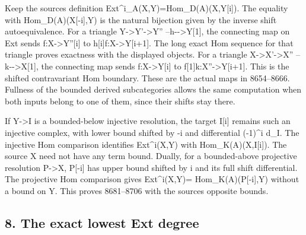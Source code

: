 Keep the source\textquotesingle s definition Ext\textasciicircum{}i\_\allowbreak{}A(X,\allowbreak{}Y)\allowbreak{}\allowbreak{}=Hom\_\allowbreak{}D(A)\allowbreak{}(X,\allowbreak{}Y[i]\allowbreak{})\allowbreak{}. The equality with Hom\_\allowbreak{}D(A)\allowbreak{}(X[-i]\allowbreak{},\allowbreak{}Y)\allowbreak{} is the natural bijection given by the inverse shift autoequivalence. For a triangle Y\allowbreak{}->Y'\allowbreak{}->Y'' --h-\allowbreak{}->Y[1]\allowbreak{},\allowbreak{} the connecting map on Ext sends f:\allowbreak{}X\allowbreak{}->Y''[i]\allowbreak{} to h[i]\allowbreak{}f:\allowbreak{}X\allowbreak{}->Y[i\allowbreak{}+1]\allowbreak{}. The long exact Hom sequence for that triangle proves exactness with the displayed objects. For a triangle X\allowbreak{}->X'\allowbreak{}->X'' --k-\allowbreak{}->X[1]\allowbreak{},\allowbreak{} the connecting map sends f:\allowbreak{}X\allowbreak{}->Y[i]\allowbreak{} to f[1]\allowbreak{}k:\allowbreak{}X''\allowbreak{}->Y[i\allowbreak{}+1]\allowbreak{}. This is the shifted contravariant Hom boundary. These are the actual maps in 8654–\allowbreak{}8666. Fullness of the bounded derived subcategories allows the same computation when both inputs belong to one of them,\allowbreak{} since their shifts stay there.

If Y\allowbreak{}->I is a bounded-below injective resolution,\allowbreak{} the target I[i]\allowbreak{} remains such an injective complex,\allowbreak{} with lower bound shifted by -i and differential (-1)\allowbreak{}\textasciicircum{}i d\_\allowbreak{}I. The injective Hom comparison identifies Ext\textasciicircum{}i(X,\allowbreak{}Y)\allowbreak{} with Hom\_\allowbreak{}K(A)\allowbreak{}(X,\allowbreak{}I[i]\allowbreak{})\allowbreak{}. The source X need not have any term bound. Dually,\allowbreak{} for a bounded-above projective resolution P\allowbreak{}->X,\allowbreak{} P[-i]\allowbreak{} has upper bound shifted by i and its full shift differential. The projective Hom comparison gives Ext\textasciicircum{}i(X,\allowbreak{}Y)\allowbreak{}\allowbreak{}= Hom\_\allowbreak{}K(A)\allowbreak{}(P[-i]\allowbreak{},\allowbreak{}Y)\allowbreak{} without a bound on Y. This proves 8681–\allowbreak{}8706 with the source\textquotesingle s opposite bounds.

\subsection{8. The exact lowest Ext degree}\label{proofs-8352-8772-the-exact-lowest-ext-degree}

